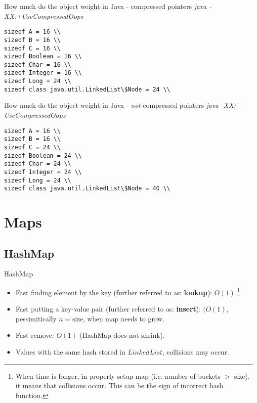 \documentclass{beamer}
\begin{document}
\begin{frame}[fragile]{How much do the object weight in Java - compressed pointers}
\textit{java -XX:+UseCompressedOops}
    \begin{verbatim}
sizeof A = 16 \\
sizeof B = 16 \\
sizeof C = 16 \\
sizeof Boolean = 16 \\
sizeof Char = 16 \\
sizeof Integer = 16 \\
sizeof Long = 24 \\
sizeof class java.util.LinkedList\$Node = 24 \\
    \end{verbatim}
\end{frame}

\begin{frame}[fragile]{How much do the object weight in Java - \textit{not} compressed pointers}
\textit{java -XX:-UseCompressedOops}
\begin{verbatim}
sizeof A = 16 \\
sizeof B = 16 \\
sizeof C = 24 \\
sizeof Boolean = 24 \\
sizeof Char = 24 \\
sizeof Integer = 24 \\
sizeof Long = 24 \\
sizeof class java.util.LinkedList\$Node = 40 \\
\end{verbatim}
\end{frame}

\section{Maps}
\subsection{HashMap}
\begin{frame}{HashMap}

\begin{itemize}
	\item Fast finding element by the key (further referred to as: \textbf{lookup}): $O(1)$.\footnote{When time is longer, in properly setup map (i.e. number of buckets $>$ size), it means that collisions occur. This can be the sign of incorrect hash function.}
    \item Fast putting a key-value pair (further referred to as: \textbf{insert}): $(O(1)$, pessimitically $n=\textrm{size}$, when map needs to grow.
    \item Fast remove: $O(1)$ (HashMap does not shrink).
    \item Values with the same hash stored in $LinkedList$, collisions may occur.
\end{itemize}
\end{frame}
\end{document}
